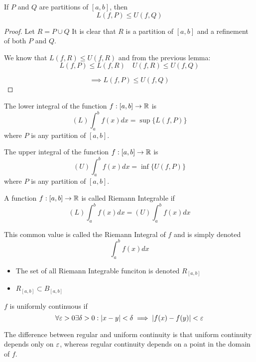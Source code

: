 \documentclass[a4paper,10pt]{article}
\begin{document}
\begin{lemma}
	If $P$ and $Q$ are partitions of $[a,b]$, then
	\[ L(f, P) \leq U(f, Q) \]
\end{lemma}

\begin{proof}
	Let $R = P \cup Q$ It is clear that $R$ is a partition of
	$[a,b]$ and a refinement of both $P$ and $Q$.

	We know that $L(f,R) \leq U(f,R)$ and from the previous lemma:
	\[ L(f,P) \leq L(f,R) \quad U(f,R) \leq U(f,Q) \]

	\[ \implies L(f,P) \leq U(f,Q) \]
\end{proof}

\begin{defn}
	The lower integral of the function $f:[a,b] \to \mathbb{R}$ is
	\[ (L) \int_a^b f(x) dx = \sup \{L(f,P)\} \]
	where $P$ is any partition of $[a,b]$.
\end{defn}

\begin{defn}
	The upper integral of the function $f:[a,b] \to \mathbb{R}$ is
	\[ (U) \int_a^b f(x) dx = \inf \{U(f,P)\} \]
	where $P$ is any partition of $[a,b]$.
\end{defn}

\begin{defn}
	A function $f:[a,b] \to \mathbb{R}$ is called Riemann Integrable if
	\[ (L) \int_a^b f(x) dx = (U) \int_a^b f(x) dx \]

	This common value is called the Riemann Integral of $f$ and is simply denoted
	\[ \int_a^b f(x) dx \]
\end{defn}

\begin{rem}
	\begin{itemize}
		\item The set of all Riemann Integrable funciton is denoted $R_{[a,b]}$
		\item $R_{[a,b]} \subset B_{[a,b]}$
	\end{itemize}
\end{rem}

\begin{defn}
	$f$ is uniformly continuous if
	\[ \forall \varepsilon > 0 \exists \delta > 0 : |x-y| < \delta \implies |f(x) - f(y)| < \varepsilon \]
\end{defn}

\begin{rem}
	The difference between regular and uniform continuity is that
	uniform continuity depends only on $\varepsilon$, whereas regular
	continuity depends on a point in the domain of $f$.
\end{rem}
\end{document}
